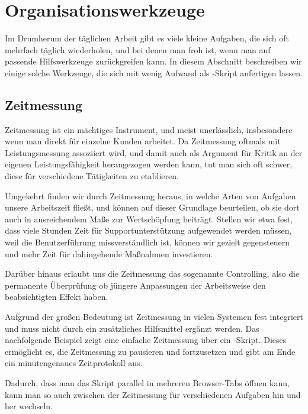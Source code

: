 \chapter{Organisationswerkzeuge}
Im Drumherum der täglichen Arbeit gibt es viele kleine Aufgaben, die sich oft mehrfach täglich wiederholen, und bei denen man froh ist, wenn man auf passende Hilfswerkzeuge zurückgreifen kann. In diesem Abschnitt beschreiben wir einige solche Werkzeuge, die sich mit wenig Aufwand als \FPZb-Skript anfertigen lassen.

\section{Zeitmessung}\label{Zeitmessung}
Zeitmessung ist ein mächtiges Instrument, und meist unerlässlich, insbesondere wenn man direkt für einzelne Kunden arbeitet. Da Zeitmessung oftmals mit Leistungsmessung assoziiert wird, und damit auch als Argument für Kritik an der eigenen Leistungsfähigkeit herangezogen werden kann, tut man sich oft schwer, diese für verschiedene Tätigkeiten zu etablieren.

Umgekehrt finden wir durch Zeitmessung heraus, in welche Arten von Aufgaben unsere Arbeitszeit fließt, und können auf dieser Grundlage beurteilen, ob sie dort auch in ausreichendem Maße zur Wertschöpfung beiträgt. Stellen wir etwa fest, dass viele Stunden Zeit für Supportunterstützung aufgewendet werden müssen, weil die Benutzerführung missverständlich ist, können wir gezielt gegensteuern und mehr Zeit für dahingehende Maßnahmen investieren. 

Darüber hinaus erlaubt uns die Zeitmessung das sogenannte Controlling, also die permanente Überprüfung ob jüngere Anpassungen der Arbeitsweise den beabsichtigten Effekt haben.

Aufgrund der großen Bedeutung ist Zeitmessung in vielen Systemen fest integriert und muss nicht durch ein zusätzliches Hilfsmittel ergänzt werden. Das nachfolgende Beispiel zeigt eine einfache Zeitmessung über ein \FPZb-Skript. Dieses ermöglicht es, die Zeitmessung zu pausieren und fortzusetzen und gibt am Ende ein minutengenaues Zeitprotokoll aus.

Dadurch, dass man das Skript parallel in mehreren Browser-Tabs öffnen kann, kann man so auch zwischen der Zeitmessung für verschiedenen Aufgaben hin und her wechseln.

